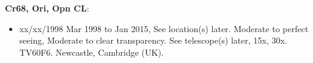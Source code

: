 {\bf Cr68, Ori, Opn CL}:
\begin{itemize}
\item xx/xx/1998 Mar 1998 to Jan 2015, See location(s) later. Moderate to perfect seeing, Moderate to clear transparency. See telescope(s) later, 15x, 30x. TV60F6. Newcastle, Cambridge (UK).
\end{itemize}

